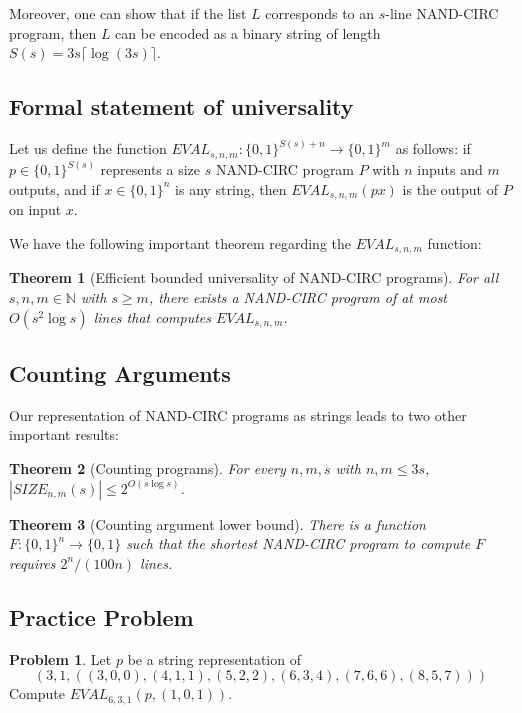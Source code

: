 \documentclass[11pt]{article}
\newtheorem{theorem}{Theorem}
\theoremstyle{definition}
\newtheorem{problem}{Problem}
\theoremstyle{remark}
\begin{document}
Moreover, one can show that if the list $L$ corresponds to an $s$-line NAND-CIRC program, then $L$ can be encoded as a binary string of length $S(s) = 3s\lceil \log(3s)\rceil$.


\vspace{2cm}

\subsection{Formal statement of universality}
Let us define the function $EVAL_{s,n,m} : \{0,1\}^{S(s)+n} \rightarrow \{0,1\}^m$ as follows: if $p \in \{0,1\}^{S(s)}$ represents a size $s$ NAND-CIRC program $P$ with $n$ inputs and $m$ outputs, and if $x \in \{0,1\}^n$ is any string, then $EVAL_{s,n,m}(px)$ is the output of $P$ on input $x$.

We have the following important theorem regarding the $EVAL_{s,n,m}$ function:

\begin{theorem}[Efficient bounded universality of NAND-CIRC programs]
For all $s,n,m \in \mathbb{N}$ with $s \ge m$, there exists a NAND-CIRC program of at most $O(s^2\log s)$ lines that computes $EVAL_{s,n,m}$.
\end{theorem}

\subsection{Counting Arguments}

Our representation of NAND-CIRC programs as strings leads to two other important results:

\begin{theorem}[Counting programs]
For every $n,m,s$ with $n,m \le 3s$, $|SIZE_{n,m}(s)| \le 2^{O(s \log s)}$.
\end{theorem}
\begin{theorem}[Counting argument lower bound]
There is a function $F : \{0,1\}^n \to \{0,1\}$ such that the shortest NAND-CIRC program to compute $F$ requires $2^n/(100n)$ lines.
\end{theorem}

\subsection{Practice Problem}

\begin{problem}
Let $p$ be a string representation of $$(3, 1, ((3, 0, 0), (4, 1, 1), (5, 2, 2), (6, 3, 4), (7, 6, 6), (8, 5, 7)))$$
Compute $EVAL_{6, 3, 1}(p, (1, 0, 1))$.
\end{problem}
\end{document}
